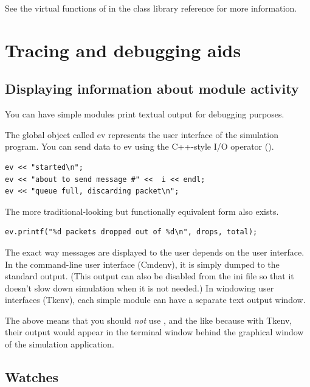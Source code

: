 See the virtual functions of  in the class library reference
for more information.





\section{Tracing and debugging aids}

\subsection{Displaying information about module activity}

You can have simple modules print textual output for
debugging purposes.

The global object called ev represents the user interface of the
simulation program. You can send data to ev using the
C++-style I/O operator (\ttt{<}\ttt{<}).

\begin{verbatim}
ev << "started\n";
ev << "about to send message #" <<  i << endl;
ev << "queue full, discarding packet\n";
\end{verbatim}

The more traditional-looking but functionally equivalent
 form also exists.

\begin{verbatim}
ev.printf("%d packets dropped out of %d\n", drops, total);
\end{verbatim}

The exact way messages are displayed to the user depends on the user
interface. In the command-line user interface (Cmdenv),
it is simply dumped to the standard output. (This output can also be
disabled from the ini file so that it doesn't slow down simulation
when it is not needed.) In windowing user interfaces
(Tkenv), each simple module can have
a separate text output window.

The above means that you should \textit{not} use ,
 \fname{<<} and the like because with Tkenv, their output
would appear in the terminal window behind the graphical window of the
simulation application.


\subsection{Watches}

